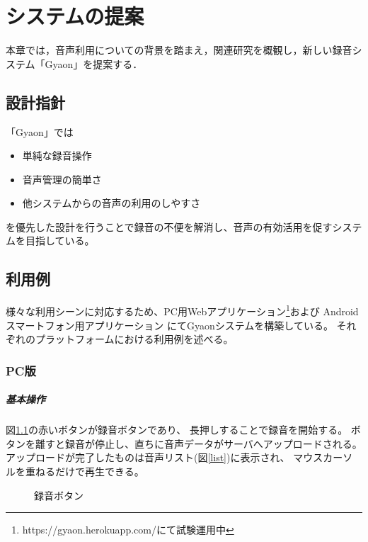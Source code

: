 \chapter{システムの提案}
\label{chap:proposal}

本章では，音声利用についての背景を踏まえ，関連研究を概観し，新しい録音システム「Gyaon」を提案する．

\newpage

\section{設計指針}

「Gyaon」では
\begin{itemize}
\item 単純な録音操作
\item 音声管理の簡単さ
\item 他システムからの音声の利用のしやすさ
\end{itemize}
を優先した設計を行うことで録音の不便を解消し、音声の有効活用を促すシステムを目指している。

\section{利用例}
様々な利用シーンに対応するため、PC用Webアプリケーション\footnote{\textsf{https://gyaon.herokuapp.com/にて試験運用中}}および
Androidスマートフォン用アプリケーション
にてGyaonシステムを構築している。
それぞれのプラットフォームにおける利用例を述べる。

\subsection{PC版}

\paragraph{基本操作}
図\ref{button}の赤いボタンが録音ボタンであり、
長押しすることで録音を開始する。
ボタンを離すと録音が停止し、直ちに音声データがサーバへアップロードされる。
アップロードが完了したものは音声リスト(図\ref{list})に表示され、
マウスカーソルを重ねるだけで再生できる。

\begin{figure}[H]
\centering
{}
\caption{録音ボタン}
\label{button}
\end{figure}

